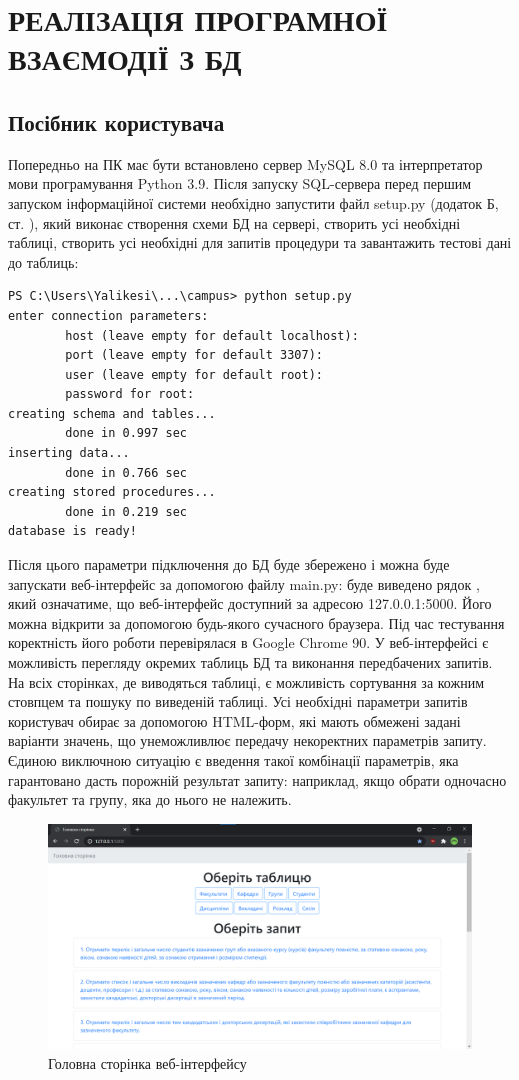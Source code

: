 \newpage
\chapter{РЕАЛІЗАЦІЯ ПРОГРАМНОЇ ВЗАЄМОДІЇ З БД}
\section{Посібник користувача}
Попередньо на ПК має бути встановлено сервер MySQL 8.0 та інтерпретатор мови програмування Python 3.9.
Після запуску SQL-сервера перед першим запуском інформаційної системи необхідно
запустити файл setup.py (додаток Б, ст. \pageref{setup}), який виконає створення 
схеми БД на сервері, створить усі необхідні таблиці, створить усі необхідні для запитів процедури
та завантажить тестові дані до таблиць:
\begin{lstlisting}[style=code]
PS C:\Users\Yalikesi\...\campus> python setup.py
enter connection parameters:
        host (leave empty for default localhost):
        port (leave empty for default 3307):
        user (leave empty for default root):
        password for root:
creating schema and tables...
        done in 0.997 sec
inserting data...
        done in 0.766 sec
creating stored procedures...
        done in 0.219 sec
database is ready!
\end{lstlisting}
Після цього параметри підключення до БД буде збережено і можна буде запускати веб-інтерфейс за
допомогою файлу main.py: буде виведено рядок ,
який означатиме, що веб-інтерфейс доступний за адресою 127.0.0.1:5000. Його можна відкрити за допомогою
будь-якого сучасного браузера. Під час тестування коректність його роботи перевірялася в Google Chrome 90.
У веб-інтерфейсі є можливість перегляду окремих таблиць БД та виконання передбачених запитів.
На всіх сторінках, де виводяться таблиці, є можливість сортування за кожним стовпцем та пошуку по виведеній таблиці.
Усі необхідні параметри запитів користувач обирає за допомогою HTML-форм, які мають обмежені задані варіанти значень, що
унеможливлює передачу некоректних параметрів запиту. Єдиною виключною ситуацію є введення такої комбінації параметрів,
яка гарантовано дасть порожній результат запиту: наприклад, якщо обрати одночасно факультет та групу, яка до нього не належить. 
\begin{figure}[H]
    \centering
    \includegraphics[scale=0.38]{pics/web_main.png}
    \caption{Головна сторінка веб-інтерфейсу}
\end{figure}

